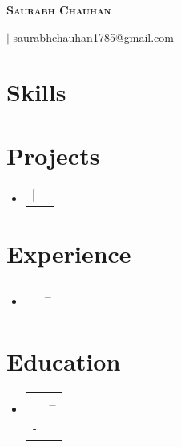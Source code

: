 \documentclass[letterpaper,11pt]{article}
\makeatletter
\newcommand{\resumeSubheading}[4]{
  \vspace{-2pt}\item
    \begin{tabular*}{0.97\textwidth}{l@{\extracolsep{\fill}}r}
      \textbf{#1} & #2 \\
      \textit{#3} & \textit{#4} \\
    \end{tabular*}\vspace{-7pt}
}
\newcommand{\resumeProjectHeading}[2]{
  \item
    \begin{tabular*}{0.97\textwidth}{l@{\extracolsep{\fill}}r}
      {#1} & #2 \\
    \end{tabular*}\vspace{-7pt}
}
\newcommand{\resumeSubHeadingListStart}{\begin{itemize}[leftmargin=0.15in, label={}]}
\newcommand{\resumeSubHeadingListEnd}{\end{itemize}}
\makeatother
\begin{document}
\begin{center}
  \textbf{\Huge \scshape Saurabh Chauhan} \\ \vspace{3pt}
  
   $|$ \href{mailto:saurabhchauhan1785@gmail.com}{\raisebox{-0.2\height}\faEnvelope\underline {saurabhchauhan1785@gmail.com}}
  
  
\end{center}

\section{Skills}
\begin{itemize}[leftmargin=0.15in, label={}]
  
  
  
  
  
\end{itemize}

\section{Projects}
\resumeSubHeadingListStart

  \resumeProjectHeading
    {\textbf{}  $|$ \emph{}}{}
    

\resumeSubHeadingListEnd

\section{Experience}
\resumeSubHeadingListStart

  \resumeSubheading
    {}{--}
    {}{}
    

\resumeSubHeadingListEnd

\section{Education}
\resumeSubHeadingListStart

  \resumeSubheading
    {}{--}
    {-}{}

\resumeSubHeadingListEnd
\end{document}
